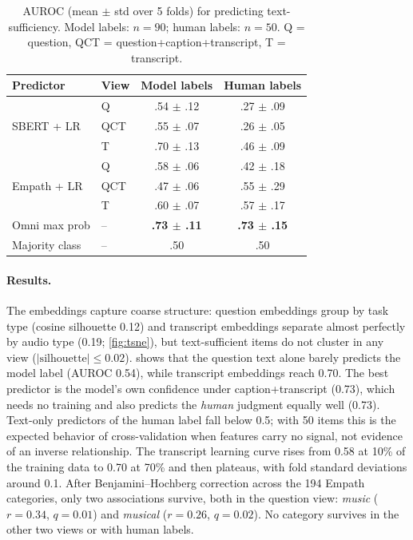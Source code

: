 \documentclass{article}
\begin{document}
\begin{table}[t]
\caption{AUROC (mean $\pm$ std over 5 folds) for predicting text-sufficiency. Model labels: $n{=}90$;
human labels: $n{=}50$. Q = question, QCT = question+caption+transcript, T = transcript.}
\label{tab:auroc}
\centering\small
\setlength{\tabcolsep}{4pt}
\begin{tabular}{llcc}
\toprule
Predictor & View & Model labels & Human labels \\
\midrule
\multirow{3}{*}{SBERT + LR}  & Q   & .54 $\pm$ .12 & .27 $\pm$ .09 \\
                             & QCT & .55 $\pm$ .07 & .26 $\pm$ .05 \\
                             & T   & .70 $\pm$ .13 & .46 $\pm$ .09 \\
\multirow{3}{*}{Empath + LR} & Q   & .58 $\pm$ .06 & .42 $\pm$ .18 \\
                             & QCT & .47 $\pm$ .06 & .55 $\pm$ .29 \\
                             & T   & .60 $\pm$ .07 & .57 $\pm$ .17 \\
Omni max prob                & --  & \textbf{.73 $\pm$ .11} & \textbf{.73 $\pm$ .15} \\
Majority class               & --  & .50 & .50 \\
\bottomrule
\end{tabular}
\end{table}

\paragraph{Results.} The embeddings capture coarse structure: question
embeddings group by task type (cosine silhouette 0.12) and transcript
embeddings separate almost perfectly by audio type (0.19; \cref{fig:tsne}), but
text-sufficient items do not cluster in any view ($|\text{silhouette}|\le0.02$).
 shows that the question text alone barely predicts the model
label (AUROC 0.54), while transcript embeddings reach 0.70. The best predictor is
the model's own confidence under caption+transcript (0.73), which needs no
training and also predicts the \emph{human} judgment equally well (0.73).
Text-only predictors of the human label fall below 0.5; with 50 items this is the
expected behavior of cross-validation when features carry no signal, not
evidence of an inverse relationship. The transcript learning curve rises from
0.58 at 10\% of the training data to 0.70 at 70\% and then plateaus, with fold
standard deviations around 0.1. After Benjamini--Hochberg correction across the 194
Empath categories, only two associations survive, both in the question view:
\emph{music} ($r{=}0.34$, $q{=}0.01$) and \emph{musical} ($r{=}0.26$, $q{=}0.02$).
No category survives in the other two views or with human labels.
\end{document}
